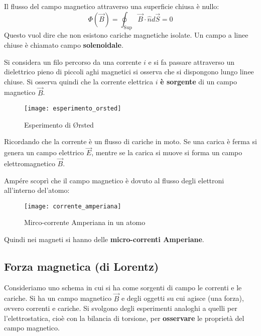\documentclass[a4paper]{article}
\begin{document}
\begin{definition}
  Il flusso del campo magnetico attraverso una superficie chiusa è nullo:
  \[
    \Phi(\vec{B}) = \oint_{\text{Sup}} \vec{B} \cdot \hat{n} d\vec{S} = 0
  \]
  Questo vuol dire che non esistono cariche magnetiche isolate.
  Un campo a linee chiuse è chiamato campo \textbf{solenoidale}.
\end{definition}

\begin{example}
  Si considera un filo percorso da una corrente \( i \) e si fa passare attraverso
  un dielettrico pieno di piccoli aghi magnetici si osserva che si dispongono lungo
  linee chiuse. Si osserva quindi che la corrente elettrica \( i \) \textbf{è sorgente}
  di un campo magnetico \( \vec{B} \).
  \begin{figure}[H]
    \centering
    \texttt{[image: esperimento\_orsted]}
    \caption{Esperimento di Ørsted}
  \end{figure}
  \noindent
  Ricordando che la corrente è un flusso di cariche in moto. Se una carica è ferma si
  genera un campo elettrico \( \vec{E} \), mentre se la carica si muove si forma un
  campo elettromagnetico \( \vec{B} \).
\end{example}
Ampére scoprì che il campo magnetico è dovuto al flusso degli elettroni all'interno
del'atomo:
\begin{figure}[H]
  \centering
  \texttt{[image: corrente\_amperiana]}
  \caption{Mirco-corrente Amperiana in un atomo}
\end{figure}
\noindent
Quindi nei magneti si hanno delle \textbf{micro-correnti Amperiane}.

\subsection{Forza magnetica (di Lorentz)}
Consideriamo uno schema in cui si ha come sorgenti di campo le correnti e le cariche.
Si ha un campo magnetico \( \vec{B} \) e degli oggetti su cui agisce (una forza),
ovvero correnti e cariche.
Si svolgono degli esperimenti analoghi a quelli per l'elettrostatica, cioè con la bilancia
di torsione, per \textbf{osservare} le proprietà del campo magnetico.
\end{document}
